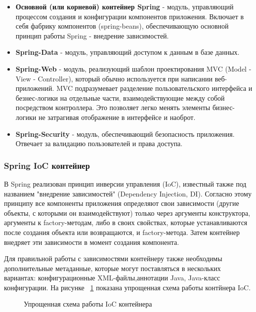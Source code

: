 \documentclass[a4paper]{article}
\begin{document}
\begin{itemize}
	
	\item \textbf{Основной (или корневой) контейнер Spring} - модуль, управляющий процессом создания и конфигурации компонентов приложения. Включает в себя фабрику компонентов (spring-beans), обеспечивающую основной принцип работы Spring - внедрение зависимостей.
	\item \textbf{Spring-Data} - модуль, управляющий доступом к данным в базе данных.
	\item \textbf{Spring-Web} - модуль, реализующий шаблон проектирования MVC (Model - View - Controller), который обычно используется при написании веб-приложений. MVC подразумевает разделение пользовательского интерфейса и безнес-логики на отдельные части, взаимодействующие между собой посредством контроллера. Это позволяет легко менять элементы бизнес-логики не затрагивая отображение в интерфейсе и наоброт.
	\item \textbf{Spring-Security} - модуль, обеспечивающий безопасность приложения. Отвечает за валидацию пользователей и права доступа.
\end{itemize}

\subsubsection{Spring IoC контейнер}

В Spring реализован принцип инверсии управления (IoC), известный также под названием "внедрение зависимостей" (Dependency Injection, DI). Согласно этому принципу все компоненты приложения определяют свои зависимости (другие объекты, с которыми он взаимодействуют) только через аргументы конструктора, аргументы к factory-методам, либо в своих свойствах, которые устанавливаются после создания объекта или возвращаются, и factory-метода. Затем контейнер внедряет эти зависимости в момент создания компонента.

Для правильной работы с зависимостями контейнеру также необходимы дополнительные метаданные, которые могут поставляться в нескольких вариантах: конфигурационные XML-файлы,аннотации Java, Java-класс конфигурации. На рисунке ~\ref{fig:image1} показана упрощенная схема работы контйнера IoC.

\begin{figure}[h]
\caption{Упрощенная схема работы IoC контейнера}
\label{fig:image1}
\end{figure}
\end{document}
